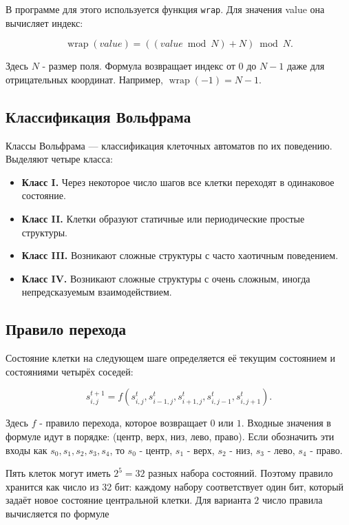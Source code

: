 В программе для этого используется функция \texttt{wrap}. Для значения value она вычисляет индекс:

\[
\operatorname{wrap}(value) = ((value \bmod N) + N) \bmod N.
\]

Здесь $N$ - размер поля. Формула возвращает индекс от $0$ до $N-1$ даже
для отрицательных координат. Например,
$\operatorname{wrap}(-1) = N-1$.

\subsection{Классификация Вольфрама}

Классы Вольфрама --- классификация клеточных автоматов по их поведению.
Выделяют четыре класса:

\begin{itemize}
    \item \textbf{Класс I.} Через некоторое число шагов все клетки переходят
    в одинаковое состояние.
    \item \textbf{Класс II.} Клетки образуют статичные или периодические
    простые структуры.
    \item \textbf{Класс III.} Возникают сложные структуры с часто хаотичным
    поведением.
    \item \textbf{Класс IV.} Возникают сложные структуры с очень сложным,
    иногда непредсказуемым взаимодействием.
\end{itemize}

\subsection{Правило перехода}

Состояние клетки на следующем шаге определяется её текущим состоянием и
состояниями четырёх соседей:

\[
s^{t+1}_{i,j} =
f\left(s^t_{i,j}, s^t_{i-1,j}, s^t_{i+1,j},
s^t_{i,j-1}, s^t_{i,j+1}\right).
\]

Здесь $f$ - правило перехода, которое возвращает $0$ или $1$. Входные
значения в формуле идут в порядке: (центр, верх, низ, лево, право).
Если обозначить эти входы как $s_0, s_1, s_2, s_3, s_4$, то $s_0$ - центр,
$s_1$ - верх, $s_2$ - низ, $s_3$ - лево, $s_4$ - право.

Пять клеток могут иметь $2^5=32$ разных набора состояний. Поэтому правило
хранится как число из 32 бит: каждому набору соответствует один бит, который
задаёт новое состояние центральной клетки. Для варианта $2$ число правила
вычисляется по формуле

